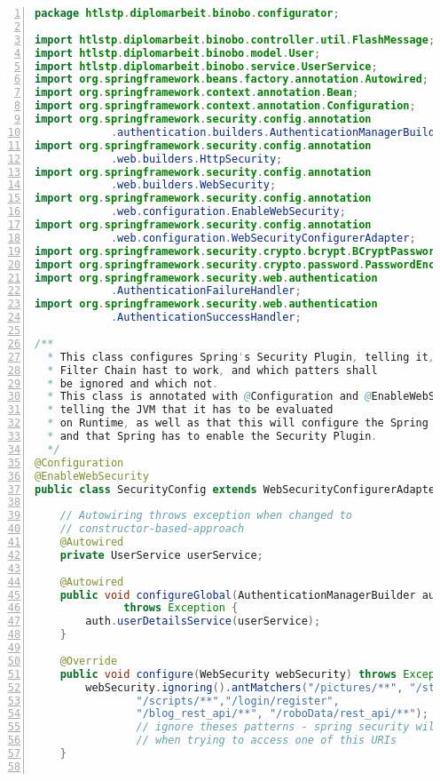 \documentclass[paper=a4,12pt]{scrreprt}
\begin{document}
\begin{lstlisting}[caption={Spring Security - Konfiguration}, captionpos=b, label={listing:spring_sec_config}, language=java, numbers=left,
  stepnumber=1]
package htlstp.diplomarbeit.binobo.configurator;

import htlstp.diplomarbeit.binobo.controller.util.FlashMessage;
import htlstp.diplomarbeit.binobo.model.User;
import htlstp.diplomarbeit.binobo.service.UserService;
import org.springframework.beans.factory.annotation.Autowired;
import org.springframework.context.annotation.Bean;
import org.springframework.context.annotation.Configuration;
import org.springframework.security.config.annotation
            .authentication.builders.AuthenticationManagerBuilder;
import org.springframework.security.config.annotation
            .web.builders.HttpSecurity;
import org.springframework.security.config.annotation
            .web.builders.WebSecurity;
import org.springframework.security.config.annotation
            .web.configuration.EnableWebSecurity;
import org.springframework.security.config.annotation
            .web.configuration.WebSecurityConfigurerAdapter;
import org.springframework.security.crypto.bcrypt.BCryptPasswordEncoder;
import org.springframework.security.crypto.password.PasswordEncoder;
import org.springframework.security.web.authentication
            .AuthenticationFailureHandler;
import org.springframework.security.web.authentication
            .AuthenticationSuccessHandler;

/**
  * This class configures Spring's Security Plugin, telling it, how the 
  * Filter Chain hast to work, and which patters shall
  * be ignored and which not.
  * This class is annotated with @Configuration and @EnableWebSecurity, 
  * telling the JVM that it has to be evaluated
  * on Runtime, as well as that this will configure the Spring environment 
  * and that Spring has to enable the Security Plugin.
  */
@Configuration
@EnableWebSecurity
public class SecurityConfig extends WebSecurityConfigurerAdapter {

    // Autowiring throws exception when changed to 
    // constructor-based-approach
    @Autowired
    private UserService userService;

    @Autowired
    public void configureGlobal(AuthenticationManagerBuilder auth) 
              throws Exception {
        auth.userDetailsService(userService);
    }

    @Override
    public void configure(WebSecurity webSecurity) throws Exception {
        webSecurity.ignoring().antMatchers("/pictures/**", "/styles/**",
                "/scripts/**","/login/register",
                "/blog_rest_api/**", "/roboData/rest_api/**");
                // ignore theses patterns - spring security will not get triggered
                // when trying to access one of this URIs
    }


\end{lstlisting}
\end{document}

